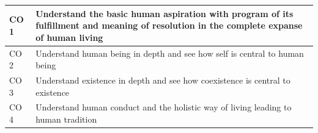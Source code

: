 \documentclass{rvcepaper}
\begin{document}
\begin{xpaper}
\begin{longtable}{|C{1.05cm}|p{12.2cm}|C{0.95cm}|C{0.95cm}|C{0.95cm}|}
\end{longtable}
\par\vspace{4pt}\par
\noindent\begin{tabular}{|C{1.3cm}|p{15cm}|}\hline CO 1 & Understand the basic human aspiration with program of its fulfillment and meaning of resolution in the complete expanse of human living\\\hline CO 2 & Understand human being in depth and see how self is central to human being\\\hline CO 3 & Understand existence in depth and see how coexistence is central to existence\\\hline CO 4 & Understand human conduct and the holistic way of living leading to human tradition\\\hline\end{tabular}
\stars{**********}
\end{xpaper}
\end{document}
